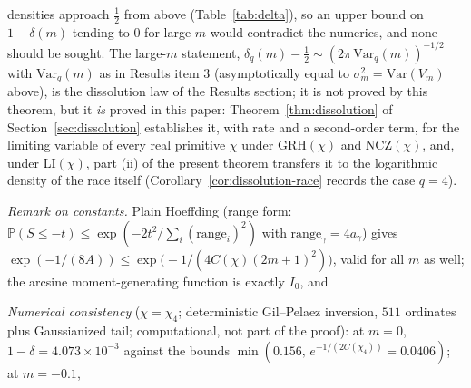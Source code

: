 \begin{lemma}
densities approach $\tfrac12$ from above (Table~\ref{tab:delta}), so an
upper bound on $1-\delta(m)$ tending to $0$ for large $m$ would
contradict the numerics, and none should be sought. The large-$m$
statement,
$\delta_q(m)-\tfrac12\sim(2\pi\,\mathrm{Var}_q(m))^{-1/2}$ with
$\mathrm{Var}_q(m)$ as in Results item 3 (asymptotically equal to
$\sigma_m^2=\mathrm{Var}(V_m)$ above), is the
dissolution law of the Results section; it is not proved by this
theorem, but it \emph{is} proved in this paper:
Theorem~\ref{thm:dissolution} of Section~\ref{sec:dissolution}
establishes it, with rate and a second-order term, for the limiting
variable of every real primitive $\chi$ under GRH$(\chi)$ and
NCZ$(\chi)$, and, under LI$(\chi)$, part (ii) of the present theorem
transfers it to the logarithmic density of the race itself
(Corollary~\ref{cor:dissolution-race} records the case $q=4$).

\emph{Remark on constants.} Plain Hoeffding (range form:
$\mathbb P(S\le-t)\le\exp(-2t^2/\sum_i(\text{range}_i)^2)$ with
$\mathrm{range}_\gamma=4a_\gamma$) gives
$\exp(-1/(8A))\le\exp\bigl(-1/(4C(\chi)(2m+1)^2)\bigr)$, valid for all
$m$ as
well; the arcsine moment-generating function is exactly $I_0$, and

\emph{Numerical consistency} ($\chi=\chi_4$; deterministic
Gil--Pelaez inversion, $511$
ordinates plus Gaussianized tail; computational, not part of the
proof): at $m=0$, $1-\delta=4.073\times10^{-3}$ against the bounds
$\min(0.156,\,e^{-1/(2C(\chi_4))}=0.0406)$; at $m=-0.1$,


\end{lemma}
